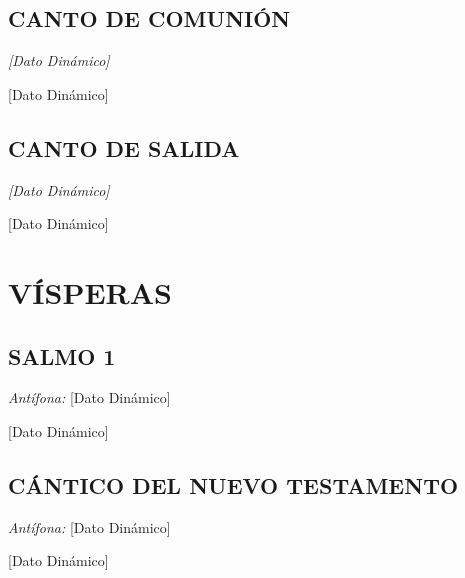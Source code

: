 \documentclass[11pt, letterpaper, twoside]{article}
\newcommand{\rubrica}[1]{\textcolor{rubricred}{\small\textit{#1}}}
\DeclareRobustCommand{\VAR}[1]{[Dato Dinámico]}
\DeclareRobustCommand{\BLOCK}[1]{}
\begin{document}
\begin{multicols}{2}
\BLOCK{ if misa.canto_comunion }
\subsection*{CANTO DE COMUNIÓN}
\noindent\rubrica{\VAR{misa.canto_comunion.titulo | escape_tex}} \par\vspace{0.1cm}
\VAR{misa.canto_comunion.letra | format_canto}
\par\vspace{0.3cm}
\BLOCK{ endif }


\BLOCK{ if misa.canto_salida }
\subsection*{CANTO DE SALIDA}
\noindent\rubrica{\VAR{misa.canto_salida.titulo | escape_tex}} \par\vspace{0.1cm}
\VAR{misa.canto_salida.letra | format_canto}
\par\vspace{0.3cm}
\BLOCK{ endif }

\BLOCK{ endif }

\BLOCK{ if visperas }
\section*{VÍSPERAS}

\BLOCK{ if visperas.salmo1 }
\subsection*{SALMO 1}
\noindent\rubrica{Antífona:} \VAR{visperas.salmo1.antifona | escape_tex} \par\vspace{0.1cm}
\VAR{visperas.salmo1.texto | escape_tex | lettrine}
\par\vspace{0.3cm}
\BLOCK{ endif }

\BLOCK{ if visperas.cantico }
\subsection*{CÁNTICO DEL NUEVO TESTAMENTO}
\noindent\rubrica{Antífona:} \VAR{visperas.cantico.antifona | escape_tex} \par\vspace{0.1cm}
\VAR{visperas.cantico.texto | escape_tex | lettrine}
\par\vspace{0.3cm}
\BLOCK{ endif }
\BLOCK{ endif }

\end{multicols}
\end{document}
